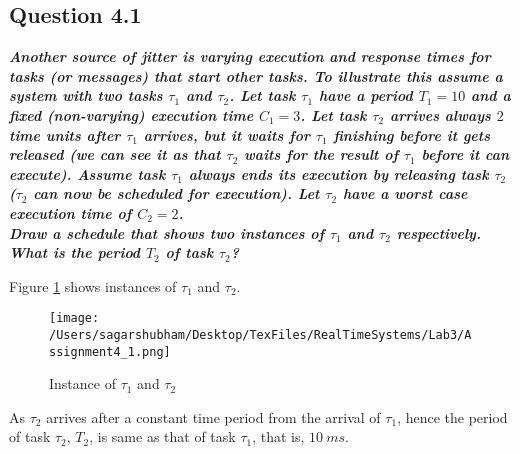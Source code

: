 \documentclass[oneside,a4paper]{article}
\begin{document}
\subsection*{\normalsize{Question 4.1}}
\textit{\textbf{Another source of jitter is varying execution and response times for tasks (or messages) that start other tasks. To illustrate this assume a system with two tasks $\tau_1$ and $\tau_2$. Let task $\tau_1$ have a period $T_1 = 10$ and a fixed (non-varying) execution time $C_1 = 3$. Let task $\tau_2$ arrives always $2$ time units after $\tau_1$ arrives, but it waits for $\tau_1$ finishing before it gets released (we can see it as that $\tau_2$ waits for the result of $\tau_1$ before it can execute). Assume task $\tau_1$ always ends its execution by releasing task $\tau_2$ ($\tau_2$ can now be scheduled for execution). Let $\tau_2$ have a worst case execution time of $C_2 = 2$. \\
Draw a schedule that shows two instances of $\tau_1$ and $\tau_2$ respectively. What is the period $T_2$ of task $\tau_2$?}} \par
Figure \ref{fig4_1} shows instances of $\tau_1$ and $\tau_2$.
\begin{center}
\begin{figure}[H]
                    \centering
                    \texttt{[image: /Users/sagarshubham/Desktop/TexFiles/RealTimeSystems/Lab3/Assignment4\_1.png]}
                    \caption[Figure for Question 4.1]{Instance of $\tau_1$ and $\tau_2$}
                    \label{fig4_1}        
\end{figure}
\end{center}\par
As $\tau_2$ arrives after a constant time period from the arrival of $\tau_1$, hence the period of task $\tau_2$, $T_2$, is same as that of task $\tau_1$, that is, $10\ ms$.
\pagebreak
\end{document}

